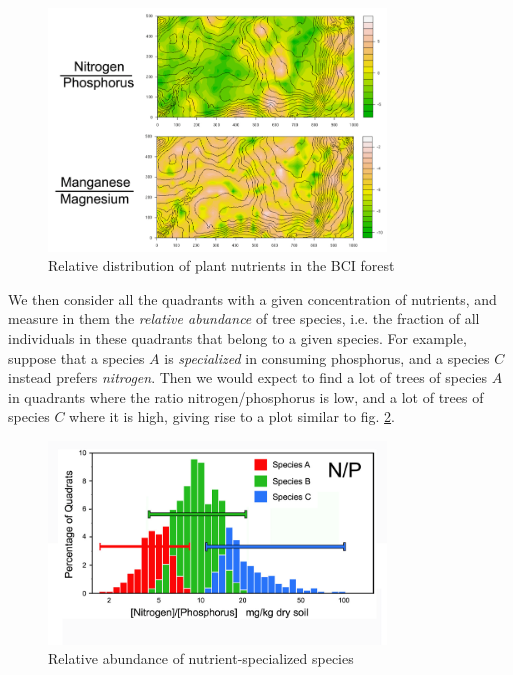 \documentclass[../../main.tex]{subfiles}
\begin{document}
\begin{figure}[H]
    \centering
    \includegraphics[width=0.8\textwidth]{relative-nutrients.png}
    \caption{Relative distribution of plant nutrients in the BCI forest}
    \label{fig:relative-nutrients}
\end{figure}

We then consider all the quadrants with a given concentration of nutrients, and measure in them the \textit{relative abundance} of tree species, i.e. the fraction of all individuals in these quadrants that belong to a given species. For example, suppose that a species $A$ is \textit{specialized} in consuming phosphorus, and a species $C$ instead prefers \textit{nitrogen}. Then we would expect to find a lot of trees of species $A$ in quadrants where the ratio nitrogen/phosphorus is low, and a lot of trees of species $C$ where it is high, giving rise to a plot similar to fig. \ref{fig:N-P-plot}.

\begin{figure}[H]
    \centering
    \includegraphics[width=0.8\textwidth]{N-P-plot.png}
    \caption{Relative abundance of nutrient-specialized species}
    \label{fig:N-P-plot}
\end{figure}
\end{document}
